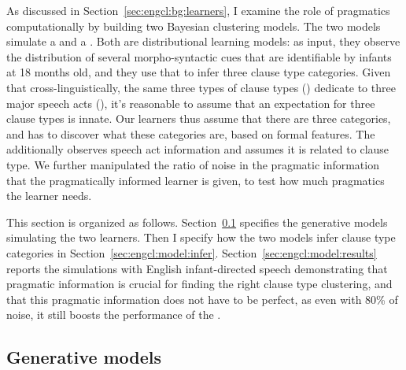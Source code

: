 As discussed in Section~\ref{sec:engcl:bg:learners}, I examine the role of pragmatics computationally by building two Bayesian clustering models. The two models simulate a \distlearner{} and a \praglearner{}. Both are distributional learning models: as input, they observe the distribution of several morpho-syntactic cues that are identifiable by infants at 18 months old, and they use that to infer three clause type categories. Given that cross-linguistically, the same three types of clause types (\diis{}) dedicate to three major speech acts (\aqrs{}), it's reasonable to assume that an expectation for three clause types is innate. Our learners thus assume that there are three categories, and has to discover what these categories are, based on formal features. The \praglearner{} additionally observes speech act information and assumes it is related to clause type. We further manipulated the ratio of noise in the pragmatic information that the pragmatically informed learner is given, to test how much pragmatics the learner needs.


This section is organized as follows. Section~\ref{sec:engcl:model:spec} specifies the generative models simulating the two learners. Then I specify how the two models infer clause type categories in Section~\ref{sec:engcl:model:infer}. Section~\ref{sec:engcl:model:results} reports the simulations with English infant-directed speech demonstrating that pragmatic information is crucial for finding the right clause type clustering, and that this pragmatic information does not have to be perfect, as even with 80\% of noise, it still boosts the performance of the \praglearner{}. 

\subsection{Generative models}
\label{sec:engcl:model:spec}

